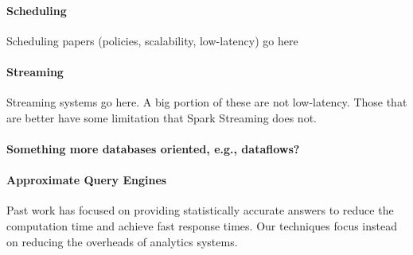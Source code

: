 
\paragraph {\bf Scheduling} Scheduling papers (policies, scalability, low-latency) go here~\cite{Sparrow}

\paragraph {\bf Streaming} Streaming systems go here. A big portion of these are not low-latency. Those that are better have some limitation that Spark Streaming does not.

\paragraph {\bf Something more databases oriented, e.g., dataflows?}

\paragraph {\bf Approximate Query Engines} Past work \cite{BlinkDB, OnlineAggregation} has focused on providing statistically accurate answers to reduce the computation time and achieve fast response times. Our techniques focus instead on reducing the overheads of analytics systems.


